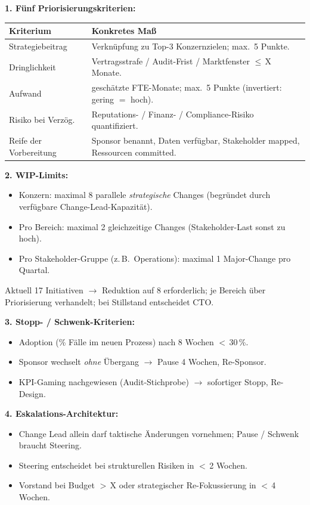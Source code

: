 \documentclass[11pt,a4paper,oneside]{article}
\begin{document}
\begin{loesungbox}
\textbf{1. F\"unf Priorisierungskriterien:}

\smallskip
\begin{tabularx}{\linewidth}{@{}p{3.4cm}X@{}}
\toprule
\textbf{Kriterium} & \textbf{Konkretes Ma{\ss}} \\
\midrule
Strategiebeitrag  & Verkn\"upfung zu Top-3 Konzernzielen; max.\ 5 Punkte. \\
Dringlichkeit     & Vertragsstrafe / Audit-Frist / Marktfenster $\leq$\,X Monate. \\
Aufwand           & gesch\"atzte FTE-Monate; max.\ 5 Punkte (invertiert: gering $=$ hoch). \\
Risiko bei Verz\"og.& Reputations- / Finanz- / Compliance-Risiko quantifiziert. \\
Reife der Vorbereitung & Sponsor benannt, Daten verf\"ugbar, Stakeholder mapped, Ressourcen committed. \\
\bottomrule
\end{tabularx}

\smallskip
\textbf{2. WIP-Limits:}
\begin{itemize}
  \item Konzern: maximal 8 parallele \emph{strategische} Changes (begr\"undet durch verf\"ugbare Change-Lead-Kapazit\"at).
  \item Pro Bereich: maximal 2 gleichzeitige Changes (Stakeholder-Last sonst zu hoch).
  \item Pro Stakeholder-Gruppe (z.\,B.\ Operations): maximal 1 Major-Change pro Quartal.
\end{itemize}
Aktuell 17 Initiativen $\rightarrow$ Reduktion auf 8 erforderlich; je Bereich \"uber Priorisierung verhandelt; bei Stillstand entscheidet CTO.

\smallskip
\textbf{3. Stopp- / Schwenk-Kriterien:}
\begin{itemize}
  \item Adoption (\% F\"alle im neuen Prozess) nach 8 Wochen $<$\,30\,\%.
  \item Sponsor wechselt \emph{ohne} \"Ubergang $\rightarrow$ Pause 4 Wochen, Re-Sponsor.
  \item KPI-Gaming nachgewiesen (Audit-Stichprobe) $\rightarrow$ sofortiger Stopp, Re-Design.
\end{itemize}

\smallskip
\textbf{4. Eskalations-Architektur:}
\begin{itemize}
  \item Change Lead allein darf taktische \"Anderungen vornehmen; Pause / Schwenk braucht Steering.
  \item Steering entscheidet bei strukturellen Risiken in $<$\,2 Wochen.
  \item Vorstand bei Budget $>$\,X oder strategischer Re-Fokussierung in $<$\,4 Wochen.
\end{itemize}


\end{loesungbox}
\end{document}

